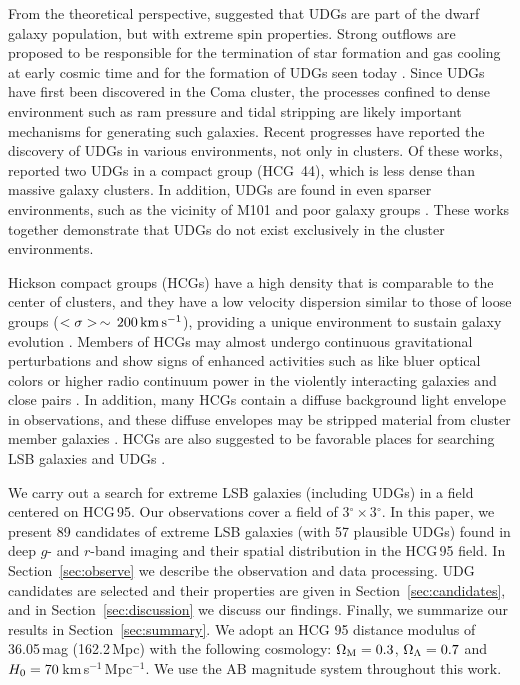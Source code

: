 \documentclass[twocolumn,trackchanges]{aastex61}
\begin{document}
From the theoretical perspective, \cite{Amorisco2016} suggested that UDGs are part of the dwarf galaxy population, but with extreme spin properties. Strong outflows are proposed to be responsible for the termination of star formation and gas cooling at early cosmic time and for the formation of UDGs seen today \citep{Janowiecki2015,Di Cintio2016}. Since UDGs have first been discovered in the Coma cluster, the processes confined to dense environment such as ram pressure and tidal stripping are likely important mechanisms for generating such galaxies. Recent progresses have reported the discovery of UDGs in various environments, not only in clusters. Of these works, \citet{Smith2016} reported two UDGs in a compact group (HCG~44), which is  less dense than massive galaxy clusters. In addition, UDGs are found in even sparser environments, such as the vicinity of M101 \citep{Merritt2016} and poor galaxy groups \citep{RomanTrujillo2016}. These works together demonstrate that UDGs do not exist exclusively in the cluster environments. 

Hickson compact groups (HCGs) have a high density that is comparable to the center of clusters, and they have a low velocity dispersion similar to those of loose groups ($<\sigma>\,\sim\,200\,\rm km\,s^{-1}$), providing a unique environment to sustain galaxy evolution \citep{Hickson1992}. Members of HCGs may almost undergo continuous gravitational perturbations and show signs of enhanced activities such as like bluer optical colors or higher radio continuum power in the violently interacting galaxies and close pairs \citep{Verdes-Montenegro1997}. In addition, many HCGs contain a diffuse background light envelope in observations, and these diffuse envelopes may be stripped material from cluster member galaxies \citep{DaRocha2005}.  HCGs are also suggested to be favorable places for searching LSB galaxies and UDGs \citep{Ordenes-Briceno2016}.



We carry out a search for extreme LSB galaxies (including UDGs) in a field centered on HCG\,95. Our observations cover a field of 3$^{\circ}$\,$\times$\,3$^\circ$. In this paper, we present 89 candidates of extreme LSB galaxies (with 57 plausible UDGs) found in deep $g$- and $r$-band imaging and their spatial distribution in the HCG\,95 field. 
In Section~\ref{sec:observe} we describe the observation and data processing. UDG candidates are selected and their properties are given in Section~\ref{sec:candidates}, and in Section~\ref{sec:discussion} we discuss our findings. Finally, we summarize our results in Section~\ref{sec:summary}. We adopt an HCG 95 distance modulus of 36.05\,mag (162.2\,Mpc) with the following cosmology: $\Omega_{\rm M} = 0.3$, $\Omega_{\rm \Lambda} =0.7$ and $ H\rm_0 = 70$\,km\,s$^{-1}$\,Mpc$^{-1}$.  We use the AB magnitude system throughout this work.
                                                                                                                                             
\end{document}

